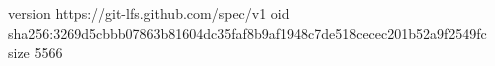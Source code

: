version https://git-lfs.github.com/spec/v1
oid sha256:3269d5cbbb07863b81604dc35faf8b9af1948c7de518cecec201b52a9f2549fc
size 5566
